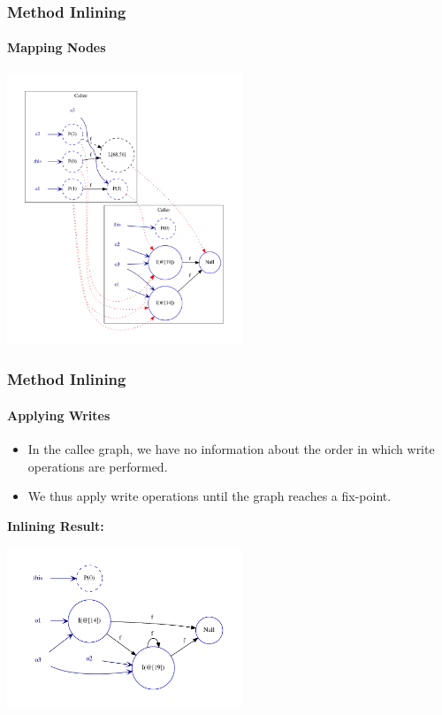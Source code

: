 \documentclass[hyperref={pdfpagelabels=false}]{beamer}
\begin{document}
\begin{frame}[fragile]
    \frametitle{Method Inlining}
    \framesubtitle{Mapping Nodes}

    \begin{center}
        \includegraphics[width=70mm]{images/pt_map1.pdf}
    \end{center}
\end{frame}

\begin{frame}[fragile]
    \frametitle{Method Inlining}
    \framesubtitle{Applying Writes}

    \begin{itemize}
        \item In the callee graph, we have no information about the order in
        which write operations are performed.
        \item We thus apply write operations until the graph reaches a
        fix-point.
    \end{itemize}

    \vspace{15pt}
    \textbf{Inlining Result:}
    \begin{center}
        \includegraphics[width=70mm]{images/pt_inline1result.pdf}
    \end{center}
\end{frame}
\end{document}
